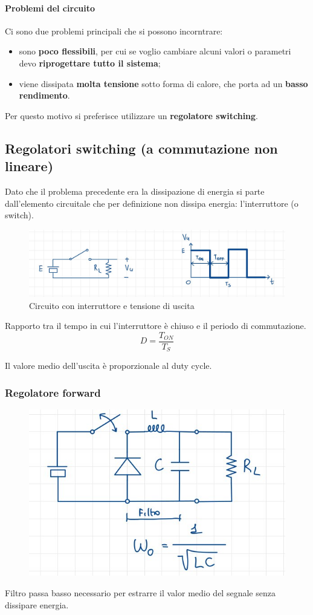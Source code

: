 \documentclass[11pt,a4paper,]{article}
\begin{document}
\paragraph{Problemi del circuito}
Ci sono due problemi principali che si possono incorntrare:
\begin{itemize}
    \item sono \textbf{poco flessibili}, per cui se voglio cambiare alcuni valori o parametri devo \textbf{riprogettare tutto il sistema};
    \item viene dissipata \textbf{molta tensione} sotto forma di calore, che porta ad un \textbf{basso rendimento}.
\end{itemize}
\noindent Per questo motivo si preferisce utilizzare un \textbf{regolatore switching}.
\subsection{Regolatori switching (a commutazione non lineare)}
Dato che il problema precedente era la dissipazione di energia si parte dall’elemento circuitale che per definizione non dissipa energia: l’interruttore (o switch).
\begin{figure}[H]
    \centering
    \includegraphics[width=0.5\linewidth]{img/reg switch.png}
    \caption{Circuito con interruttore e tensione di uscita}
\end{figure}
\begin{definizione}
    Rapporto tra il tempo in cui l'interruttore è chiuso e il periodo di commutazione.
    \[
    D=\frac{T_{ON}}{T_S}
    \]
\end{definizione}
Il valore medio dell'uscita è proporzionale al duty cycle.
\subsubsection{Regolatore forward}
\begin{figure}[H]
    \centering
    \includegraphics[width=0.4\linewidth]{img/reg fw.png}
\end{figure}
\begin{nota}
    Filtro passa basso necessario per estrarre il valor medio del segnale senza dissipare energia.
\end{nota}
\end{document}

